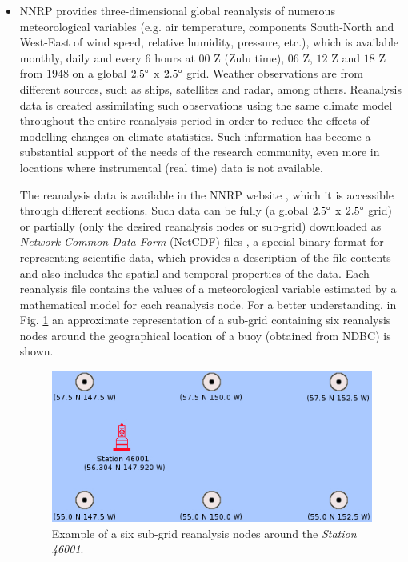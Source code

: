 \documentclass[review]{elsarticle}
\begin{document}
\begin{itemize}
			\item NNRP provides three-dimensional global reanalysis of numerous meteorological variables (e.g. air temperature, components South-North and West-East of wind speed, relative humidity, pressure, etc.), which is available monthly, daily and every $6$ hours at $00$ Z (Zulu time), $06$ Z, $12$ Z and $18$ Z from $1948$ on a global $2.5\degree$ x $2.5\degree$ grid. Weather observations are from different sources, such as ships, satellites and radar, among others. Reanalysis data is created assimilating such observations using the same climate model throughout the entire reanalysis period in order to reduce the effects of modelling changes on climate statistics. Such information has become a substantial support of the needs of the research community, even more in locations where instrumental (real time) data is not available.
			
			The reanalysis data is available in the NNRP website \cite{NNRP}, which it is accessible through different sections. Such data can be fully (a global $2.5\degree$ x $2.5\degree$ grid) or partially (only the desired reanalysis nodes or sub-grid) downloaded as \textit{Network Common Data Form} (NetCDF) files \cite{NetCDF}, a special binary format for representing scientific data, which provides a description of the file contents and also includes the spatial and temporal properties of the data. Each reanalysis file contains the values of a meteorological variable estimated by a mathematical model for each reanalysis node. For a better understanding, in Fig. \ref{fig:subGrid} an approximate representation of a sub-grid containing six reanalysis nodes around the geographical location of a buoy (obtained from NDBC) is shown.
			
			
			\begin{figure}[ht!]
				\centering
				\includegraphics[scale=0.52]{figures/FigureSubGrid.jpg}
				\caption{Example of a six sub-grid reanalysis nodes around the \textit{Station 46001}.}
				\label{fig:subGrid}
			\end{figure}
			
		\end{itemize}
		
\end{document}
